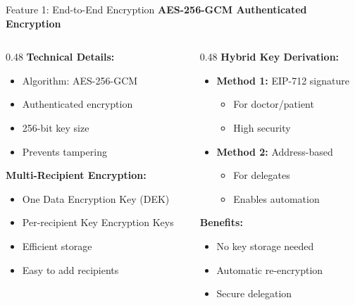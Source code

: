 \documentclass[10pt]{beamer}
\begin{document}
\begin{frame}{Feature 1: End-to-End Encryption}
\textbf{AES-256-GCM Authenticated Encryption}

\vspace{0.2cm}
\begin{columns}[T]
\begin{column}{0.48\textwidth}
\textbf{Technical Details:}
\begin{itemize}
\item Algorithm: AES-256-GCM
\item Authenticated encryption
\item 256-bit key size
\item Prevents tampering
\end{itemize}

\textbf{Multi-Recipient Encryption:}
\begin{itemize}
\item One Data Encryption Key (DEK)
\item Per-recipient Key Encryption Keys
\item Efficient storage
\item Easy to add recipients
\end{itemize}
\end{column}

\begin{column}{0.48\textwidth}
\textbf{Hybrid Key Derivation:}
\begin{itemize}
\item \textbf{Method 1:} EIP-712 signature
    \begin{itemize}
    \item For doctor/patient
    \item High security
    \end{itemize}
\item \textbf{Method 2:} Address-based
    \begin{itemize}
    \item For delegates
    \item Enables automation
    \end{itemize}
\end{itemize}

\vspace{0.1cm}
\textbf{Benefits:}
\begin{itemize}
\item No key storage needed
\item Automatic re-encryption
\item Secure delegation
\end{itemize}
\end{column}
\end{columns}
\end{frame}
\end{document}
